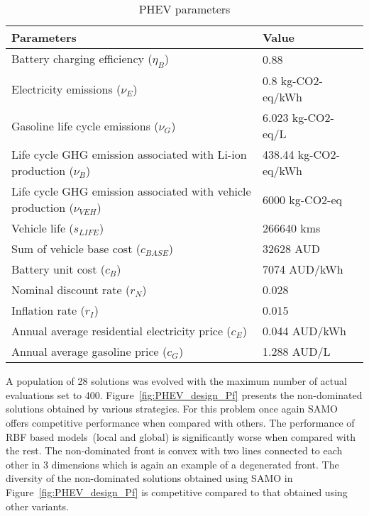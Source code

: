 \begin{table}[!htb]\scriptsize
	\centering
	\caption{PHEV parameters}
	\begin{tabular}{|p{4cm}|p{2cm}|}
		\noalign{\smallskip}\hline
		\textbf{Parameters}                                                      & \textbf{Value}       \\ \hline
		Battery charging efficiency ($\eta_B$)                                   & 0.88                 \\ \hline
		Electricity emissions ($\nu_E$)                                          & 0.8 kg-CO2-eq/kWh    \\ \hline
		Gasoline life cycle emissions ($\nu_G$)                                  & 6.023 kg-CO2-eq/L   \\ \hline
		Life cycle GHG emission associated with Li-ion production ($\nu_B$)      & 438.44 kg-CO2-eq/kWh \\ \hline
		Life cycle GHG emission associated with vehicle production ($\nu_{VEH}$) & 6000 kg-CO2-eq       \\ \hline
		Vehicle life ($s_{LIFE}$)                                                & 266640 kms           \\ \hline
		Sum of vehicle base cost ($c_{BASE}$)                                    & 32628 AUD            \\ \hline
		Battery unit cost ($c_B$)                                                & 7074 AUD/kWh         \\ \hline
		Nominal discount rate ($r_N$)                                            & 0.028                \\ \hline
		Inflation rate ($r_I$)                                                   & 0.015                \\ \hline
		Annual average residential electricity price ($c_E$)                     & 0.044 AUD/kWh        \\ \hline
		Annual average gasoline price ($c_G$)                                    & 1.288 AUD/L        \\ \hline
	\end{tabular}
	\label{tab:phevparam}
\end{table}

A population of 28 solutions was evolved with the maximum number of actual evaluations set to 400. Figure~\ref{fig:PHEV_design_Pf} presents the non-dominated solutions obtained by various strategies. For this problem once again SAMO offers competitive performance when compared with others. The performance of RBF based models~(local and global) is significantly worse when compared with the rest. The non-dominated front is convex with two lines connected to each other in 3 dimensions which is again an example of a degenerated front. The diversity of the non-dominated solutions obtained using SAMO in Figure~\ref{fig:PHEV_design_Pf} is competitive compared to that obtained using other variants.

